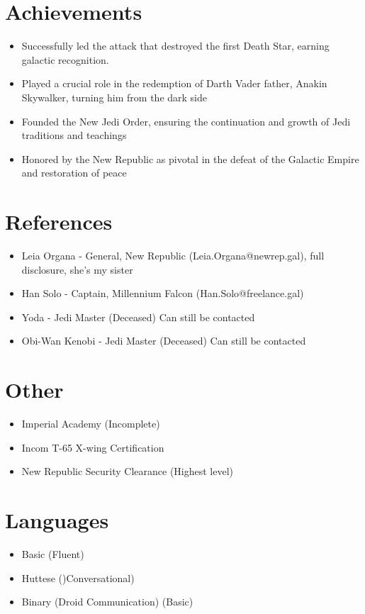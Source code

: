 \documentclass[11pt,a4paper]{moderncv}
\begin{document}
\begin{flushleft}
		\section{Achievements}
		{\begin{itemize}[leftmargin=0.8cm, , rightmargin=0.3cm, label=\textbullet]
				\item Successfully led the attack that destroyed the first Death Star, earning galactic recognition.
				\item Played a crucial role in the redemption of Darth Vader father, Anakin Skywalker, turning him from the dark side
				\item Founded the New Jedi Order, ensuring the continuation and growth of Jedi traditions and teachings
				\item Honored by the New Republic as pivotal in the defeat of the Galactic Empire and restoration of peace
		\end{itemize}} 
	
		\section{References}
		{\begin{itemize}[leftmargin=0.8cm, , rightmargin=0.3cm, label=\textbullet]
				\item Leia Organa - General, New Republic (Leia.Organa@newrep.gal), full disclosure, she's my sister
				\item Han Solo - Captain, Millennium Falcon (Han.Solo@freelance.gal)
				\item Yoda - Jedi Master (Deceased) Can still be contacted
				\item Obi-Wan Kenobi - Jedi Master (Deceased) Can still be contacted
		\end{itemize}} 
		
		\section{Other}
		{\begin{itemize}[leftmargin=0.8cm, , rightmargin=0.3cm, label=\textbullet]
				\item Imperial Academy (Incomplete)
				\item Incom T-65 X-wing Certification
				\item New Republic Security Clearance (Highest level)
		\end{itemize}} 
		
		\section{Languages}
		{\begin{itemize}[leftmargin=0.8cm, , rightmargin=0.3cm, label=\textbullet]
				\item Basic (Fluent)
				\item Huttese ()Conversational)
				\item Binary (Droid Communication) (Basic)
		\end{itemize}} 
		

\end{flushleft}
\end{document}
